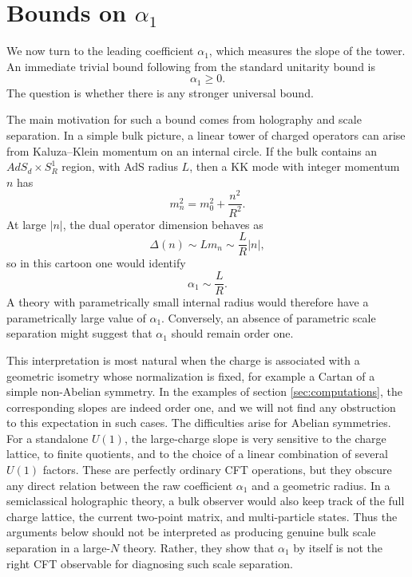 \documentclass[a4paper,11pt]{article}
\begin{document}
\section{Bounds on $\alpha_1$}\label{sec:alpha1}

We now turn to the leading coefficient $\alpha_1$, which measures the slope of the tower. An immediate trivial bound following from the standard unitarity bound is
\begin{equation}
  \alpha_1\geq0.
\end{equation}
The question is whether there is any stronger universal bound.

The main motivation for such a bound comes from holography and scale separation. In a simple bulk picture, a linear tower of charged operators can arise from Kaluza--Klein momentum on an internal circle. If the bulk contains
an $AdS_d\times S^1_R$ region, with AdS radius $L$, then a KK mode with integer momentum $n$ has
\begin{equation}
  m_n^2=m_0^2+\frac{n^2}{R^2}.
\end{equation}
At large $|n|$, the dual operator dimension behaves as
\begin{equation}
  \Delta(n)\sim Lm_n\sim \frac{L}{R}|n|,
\end{equation}
so in this cartoon one would identify
\begin{equation}
  \alpha_1\sim \frac{L}{R}.
\end{equation}
A theory with parametrically small internal radius would therefore have a parametrically large value of $\alpha_1$. Conversely, an absence of parametric scale separation might suggest that $\alpha_1$ should remain order one. 

This interpretation is most natural when the charge is associated with a geometric isometry whose normalization is fixed, for example a Cartan of a simple non-Abelian symmetry. In the examples of section \ref{sec:computations},
the corresponding slopes are indeed order one, and we will not find any obstruction to this expectation in such cases. The difficulties arise for Abelian symmetries. For a standalone $U(1)$, the large-charge slope is very
sensitive to the charge lattice, to finite quotients, and to the choice of a linear combination of several $U(1)$ factors. These are perfectly ordinary CFT operations, but they obscure any direct relation between the raw coefficient $\alpha_1$ and a geometric radius. In a semiclassical holographic theory, a bulk observer would also keep track of the full charge lattice, the current two-point matrix, and multi-particle states. Thus the arguments below should not be interpreted as producing genuine bulk scale separation in a large-$N$ theory. Rather, they show that $\alpha_1$ by itself is not the right CFT observable for diagnosing such scale separation.
\end{document}
